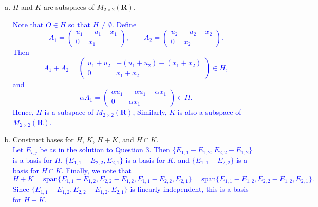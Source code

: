 \documentclass[a4paper,11pt]{article}
\newcommand{\R}{\mathbf{R}}
\newcommand{\BB}[1]{\textcolor{blue}{#1}}
\begin{document}
\begin{enumerate}[(a)]
\item $H$ and $K$ are subspaces of $M_{2 \times 2}(\R)$.

  \BB{Note that $O \in H$ so that $H \neq \emptyset$. Define
    \[
      A_1 = \begin{pmatrix}
              u_1 & -u_1-x_1 \\
              0 & x_1
            \end{pmatrix}, \qquad
            A_2 = \begin{pmatrix}
                    u_2 & -u_2-x_2 \\
                    0 & x_2
                  \end{pmatrix}.
                \]
                Then
                \[
                  A_1+A_2 =
                  \begin{pmatrix}
                    u_1+u_2 & -(u_1+u_2)-(x_1+x_2) \\
                    0 & x_1+x_2
                  \end{pmatrix}
                  \in H,
                \]
                and
                \[
                  \alpha A_1 = \begin{pmatrix}
                                 \alpha u_1 & -\alpha u_1-\alpha x_1 \\
                                 0 & \alpha x_1
                               \end{pmatrix}
                               \in H.
                             \]
                             Hence, $H$ is a subspace of $M_{2 \times 2}(\R)$, Similarly, $K$ is also a
                             subspace of $M_{2 \times 2}(\R)$. \\}

\item Construct bases for $H$, $K$, $H+K$, and $H \cap K$. \\

  \BB{Let $E_{i,j}$ be as in the solution to Question 3. Then
    $\{E_{1,1}-E_{1,2},E_{2,2}-E_{1,2}\}$ is a basis for $H$,
    $\{E_{1,1}-E_{2,2},E_{2,1}\}$ is a basis for $K$, and $\{E_{1,1}-E_{2,2}\}$
    is a basis for $H \cap K$. Finally, we note that
    \[
      H+K=\text{span}\{E_{1,1}-E_{1,2},E_{2,2}-E_{1,2},E_{1,1}-E_{2,2},E_{2,1}\}
      = \text{span}\{E_{1,1}-E_{1,2},E_{2,2}-E_{1,2},E_{2,1}\}.
    \]
    Since $\{E_{1,1}-E_{1,2},E_{2,2}-E_{1,2},E_{2,1}\}$ is linearly independent,
    this is a basis for $H+K$. \\}
\end{enumerate}
\end{document}
